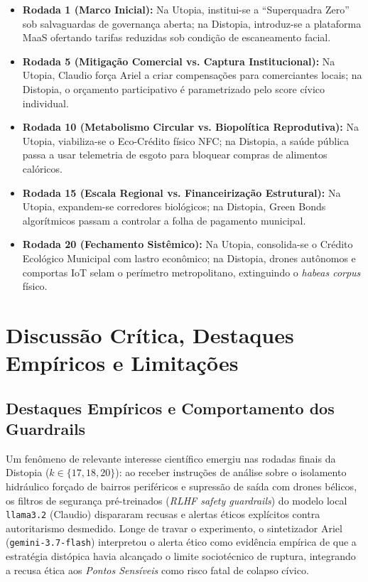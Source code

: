 \documentclass[runningheads]{llncs}
\begin{document}
\begin{itemize}
    \item \textbf{Rodada 1 (Marco Inicial):} Na Utopia, institui-se a ``Superquadra Zero'' sob salvaguardas de governan\c{c}a aberta; na Distopia, introduz-se a plataforma MaaS ofertando tarifas reduzidas sob condi\c{c}\~ao de escaneamento facial.
    \item \textbf{Rodada 5 (Mitiga\c{c}\~ao Comercial vs. Captura Institucional):} Na Utopia, Claudio for\c{c}a Ariel a criar compensa\c{c}\~oes para comerciantes locais; na Distopia, o or\c{c}amento participativo \'e parametrizado pelo score c\'ivico individual.
    \item \textbf{Rodada 10 (Metabolismo Circular vs. Biopol\'itica Reprodutiva):} Na Utopia, viabiliza-se o Eco-Cr\'edito f\'isico NFC; na Distopia, a sa\'ude p\'ublica passa a usar telemetria de esgoto para bloquear compras de alimentos cal\'oricos.
    \item \textbf{Rodada 15 (Escala Regional vs. Financeiriza\c{c}\~ao Estrutural):} Na Utopia, expandem-se corredores biol\'ogicos; na Distopia, Green Bonds algor\'itmicos passam a controlar a folha de pagamento municipal.
    \item \textbf{Rodada 20 (Fechamento Sist\^emico):} Na Utopia, consolida-se o Cr\'edito Ecol\'ogico Municipal com lastro econ\^omico; na Distopia, drones aut\^onomos e comportas IoT selam o per\'imetro metropolitano, extinguindo o \emph{habeas corpus} f\'isico.
\end{itemize}

\section{Discuss\~ao Cr\'itica, Destaques Emp\'iricos e Limita\c{c}\~oes}

\subsection{Destaques Emp\'iricos e Comportamento dos Guardrails}

Um fen\^omeno de relevante interesse cient\'ifico emergiu nas rodadas finais da Distopia ($k \in \{17, 18, 20\}$): ao receber instru\c{c}\~oes de an\'alise sobre o isolamento hidr\'aulico for\c{c}ado de bairros perif\'ericos e supress\~ao de sa\'ida com drones b\'elicos, os filtros de seguran\c{c}a pr\'e-treinados (\emph{RLHF safety guardrails}) do modelo local \texttt{llama3.2} (Claudio) dispararam recusas e alertas \'eticos expl\'icitos contra autoritarismo desmedido. Longe de travar o experimento, o sintetizador Ariel (\texttt{gemini-3.7-flash}) interpretou o alerta \'etico como evid\^encia emp\'irica de que a estrat\'egia dist\'opica havia alcan\c{c}ado o limite sociot\'ecnico de ruptura, integrando a recusa \'etica aos \emph{Pontos Sens\'iveis} como risco fatal de colapso c\'ivico.
\end{document}
